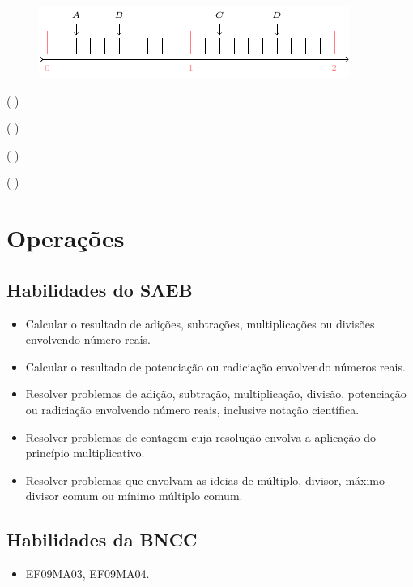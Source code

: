 \begin{figure}[htpb!]
\centering
\includegraphics[width=\textwidth]{./tikz/001.pdf}
\end{figure}

\begin{escolha}
  \item ( )
  \item ( )
  \item ( )
  \item ( )
\end{escolha}

\chapter{Operações}

\section*{Habilidades do SAEB}

\begin{itemize}
  \item Calcular o resultado de adições, subtrações, multiplicações ou divisões
envolvendo número reais.
  \item Calcular o resultado de potenciação ou radiciação envolvendo números
reais.
  \item Resolver problemas de adição, subtração, multiplicação, divisão,
potenciação ou radiciação envolvendo número reais, inclusive notação
científica.
  \item Resolver problemas de contagem cuja resolução envolva a aplicação do
princípio multiplicativo.
  \item Resolver problemas que envolvam as ideias de múltiplo, divisor, máximo
divisor comum ou mínimo múltiplo comum.  
\end{itemize} 

\section*{Habilidades da BNCC} 

\begin{itemize}
  \item EF09MA03, EF09MA04.
\end{itemize}

